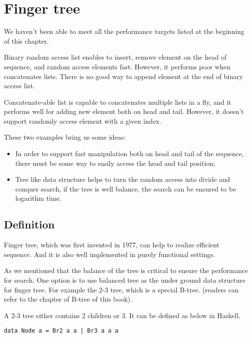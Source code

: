 \documentclass[UTF8]{article}
\begin{document}
\section{Finger tree}
We haven't been able to meet all the performance targets listed at the beginning
of this chapter.

Binary random access list enables to insert, remove element
on the head of sequence, and random access elements fast. However, it performs
poor when concatenates lists. There is no good way to append element at the
end of binary access list.

Concatenate-able list is capable to concatenates multiple lists in a fly, and
it performs well for adding new element both on head and tail. However, it doesn't
support randomly access element with a given index.

These two examples bring us some ideas:

\begin{itemize}
\item In order to support fast manipulation both on head and tail of the sequence,
there must be some way to easily access the head and tail position;
\item Tree like data structure helps to turn the random access into divide and
conquer search, if the tree is well balance, the search can be ensured to
be logarithm time.
\end{itemize}

\subsection{Definition}
Finger tree\cite{finger-tree-1977}, which was first invented in 1977, can help to
realize efficient sequence. And it is also well implemented in purely functional
settings\cite{finger-tree-2006}.

As we mentioned that the balance of the tree is critical to ensure the performance
for search. One option is to use balanced tree as the under ground data structure
for finger tree. For example the 2-3 tree, which is a special B-tree. (readers
can refer to the chapter of B-tree of this book).

A 2-3 tree either contains 2 children or 3. It can be defined as below in Haskell.

\lstset{language=Haskell}
\begin{lstlisting}
data Node a = Br2 a a | Br3 a a a
\end{lstlisting}
\end{document}

